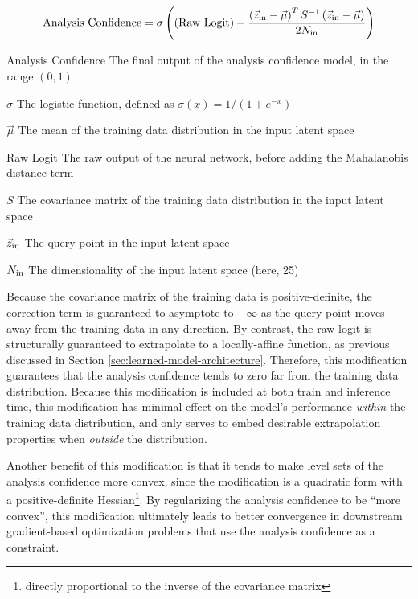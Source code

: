 \documentclass[journal]{new-aiaa}
\begin{document}
\begin{equation}
    \text{Analysis Confidence} = \sigma
    \left(
    \left(\text{Raw Logit}\right) -
    \frac{
        \left( \vec{z}_{\rm in} - \vec\mu \right) ^ T
        S ^{-1}
        \left( \vec{z}_{\rm in} - \vec\mu \right)
    }{2 N_{\rm in}}
    \right)
    \label{eq:uq}
\end{equation}

\begin{eqexpl}[30mm]
    \item{Analysis Confidence} The final output of the analysis confidence model, in the range $(0, 1)$
    \item{$\sigma$} The logistic function, defined as $\sigma(x) = 1 / (1 + e^{-x})$
    \item{$\vec\mu$} The mean of the training data distribution in the input latent space
    \item{Raw Logit} The raw output of the neural network, before adding the Mahalanobis distance term
    \item{$S$} The covariance matrix of the training data distribution in the input latent space
    \item{$\vec{z}_{\rm in}$} The query point in the input latent space
    \item{$N_{\rm in}$} The dimensionality of the input latent space (here, 25)
\end{eqexpl}

Because the covariance matrix of the training data is positive-definite, the correction term is guaranteed to asymptote to $-\infty$ as the query point moves away from the training data in any direction. By contrast, the raw logit is structurally guaranteed to extrapolate to a locally-affine function, as previous discussed in Section \ref{sec:learned-model-architecture}. Therefore, this modification guarantees that the analysis confidence tends to zero far from the training data distribution. Because this modification is included at both train and inference time, this modification has minimal effect on the model's performance \textit{within} the training data distribution, and only serves to embed desirable extrapolation properties when \textit{outside} the distribution.

Another benefit of this modification is that it tends to make level sets of the analysis confidence more convex, since the modification is a quadratic form with a positive-definite Hessian\footnote{directly proportional to the inverse of the covariance matrix}. By regularizing the analysis confidence to be ``more convex'', this modification ultimately leads to better convergence in downstream gradient-based optimization problems that use the analysis confidence as a constraint.
\end{document}
